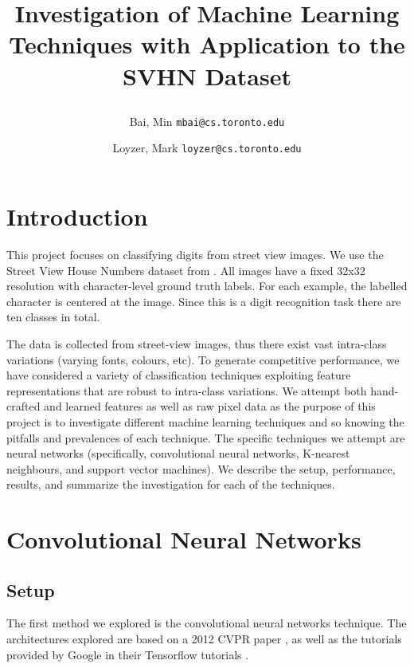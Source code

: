\documentclass{article} %
\begin{document}
\title{Investigation of Machine Learning Techniques with Application to the SVHN Dataset
\author{Bai, Min \texttt{mbai@cs.toronto.edu}}
\author{Loyzer, Mark \texttt{loyzer@cs.toronto.edu}}
}

\newcommand{\fix}{\marginpar{FIX}}
\newcommand{\new}{\marginpar{NEW}}

\nipsfinalcopy %

\maketitle

\section{Introduction}
This project focuses on classifying digits from street view images.  We use the Street View House Numbers dataset from \cite{svhn}. All images have a fixed 32x32 resolution with character-level ground truth labels. For each example, the labelled character is centered at the image. Since this is a digit recognition task there are ten classes in total.

The data is collected from street-view images, thus there exist vast intra-class variations (varying fonts, colours, etc). To generate competitive performance, we have considered a variety of classification techniques exploiting feature representations that are robust to intra-class variations. We attempt both hand-crafted and learned features as well as raw pixel data as the purpose of this project is to investigate different machine learning techniques and so knowing the pitfalls and prevalences of each technique. The specific techniques we attempt are neural networks (specifically, convolutional neural networks, K-nearest neighbours, and support vector machines).  We describe the setup, performance, results, and summarize the investigation for each of the techniques.

\section{Convolutional Neural Networks}

\subsection{Setup}

The first method we explored is the convolutional neural networks technique. The architectures explored are based on a 2012 CVPR paper \cite{lecun2012}, as well as the tutorials provided by Google in their Tensorflow tutorials \cite{googletensorflow}. 
\end{document}
